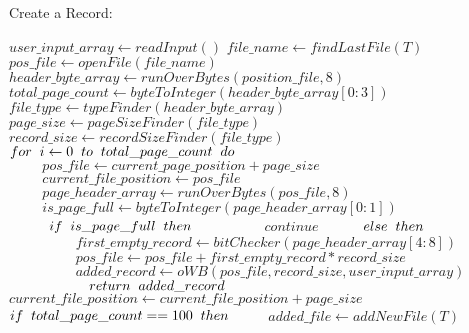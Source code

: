\documentclass[12pt]{report}
\begin{document}
\begin{algorithm}
\caption{Create a Record:}
\begin{algorithmic}[1]
	\STATE $user\_input\_array \leftarrow readInput()$
	\STATE $file\_name \leftarrow findLastFile(T)$
	\STATE $pos\_file \leftarrow openFile(file\_name)$
	\STATE $header\_byte\_array \leftarrow runOverBytes(position\_file, 8)$
	\STATE $total\_page\_count \leftarrow byteToInteger(header\_byte\_array[0:3])$
	\STATE $file\_type \leftarrow typeFinder(header\_byte\_array)$
	\STATE $page\_size \leftarrow pageSizeFinder(file\_type)$
	\STATE $record\_size \leftarrow recordSizeFinder(file\_type)$
	\STATE $for\hspace{0.2cm}i\leftarrow0\hspace{0.2cm}to\hspace{0.2cm}total\_page\_count\hspace{0.2cm}do$
	\STATE $\hspace{1cm}pos\_file \leftarrow current\_page\_position + page\_size$
	\STATE $\hspace{1cm}current\_file\_position \leftarrow pos\_file$
	\STATE $\hspace{1cm}page\_header\_array \leftarrow runOverBytes(pos\_file, 8)$
	\STATE $\hspace{1cm}is\_page\_full \leftarrow byteToInteger(page\_header\_array[0:1])$
	\STATE $\hspace{1cm}if\hspace{0.2cm}is\_page\_full\hspace{0.2cm}then$
	\STATE $\hspace{2cm}continue$
	\STATE $\hspace{1cm}else\hspace{0.2cm}then$
	\STATE $\hspace{2cm}first\_empty\_record \leftarrow bitChecker(page\_header\_array[4:8])$
	\STATE $\hspace{2cm}{pos\_file}\leftarrow{pos\_file}+{first\_empty\_record}*{record\_size}$
	\STATE $\hspace{2cm}added\_record \leftarrow oWB(pos\_file, record\_size, user\_input\_array)$
	\STATE $\hspace{2cm}return\hspace{0.2cm}added\_record$
	\STATE $current\_file\_position \leftarrow current\_file\_position + page\_size$
	\STATE $if\hspace{0.2cm}total\_page\_count==100\hspace{0.2cm}then$
	\STATE $\hspace{1cm}added\_file \leftarrow addNewFile(T)$

\end{algorithmic}
\end{algorithm}
\end{document}
